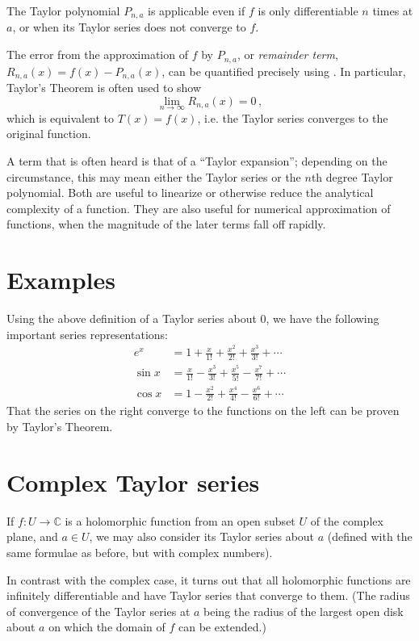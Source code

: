 \documentclass[12pt]{article}
\newcommand{\complex}{\mathbb{C}}
\providecommand{\defnterm}[1]{\emph{#1}}
\begin{document}
The Taylor polynomial $P_{n,a}$ is applicable even if $f$ is only
differentiable $n$ times at $a$, or when its Taylor series does 
not converge to $f$.

The error from the approximation of $f$ by $P_{n,a}$,  
or \defnterm{remainder term}, $R_{n,a}(x) = f(x) - P_{n,a}(x)$, 
can be quantified precisely
using  .
In particular, Taylor's Theorem is often used to show
\[
 \lim_{n\rightarrow \infty} R_{n,a}(x) = 0 \,,
\]
which is equivalent to $T(x) = f(x)$, i.e. the Taylor series
converges to the original function.

A term that is often heard is that of a ``Taylor expansion'';
depending on the circumstance, this may mean either the Taylor series
or the $n$th degree Taylor polynomial.
Both are useful to linearize or otherwise reduce the analytical complexity of a function.  They are also useful for numerical approximation of functions,
when the magnitude of the later terms fall off rapidly.  

\section{Examples}
Using the above definition of a Taylor series about $0$, we have the following important series representations:
\begin{align*}
 e^x &= 1 + \frac{x}{1!} + \frac{x^2}{2!} + \frac{x^3}{3!} + \cdots \\ 
  \sin x &= \frac{x}{1!} - \frac{x^3}{3!} + \frac{x^5}{5!} - \frac{x^7}{7!} + \cdots \\
  \cos x &= 1-\frac{x^2}{2!} + \frac{x^4}{4!} - \frac{x^6}{6!} + \cdots 
\end{align*}
That the series on the right converge to the functions on the left
can be proven by Taylor's Theorem.

\section{Complex Taylor series}
If $f\colon U \to \complex$ is a holomorphic function from an open subset $U$ of the complex plane, and $a \in U$, we may also consider its Taylor series about $a$ (defined with the same formulae as before, but with complex numbers).

In contrast with the complex case, it turns out that all holomorphic functions
are infinitely differentiable and have Taylor series that converge to them.
(The radius of convergence of the Taylor series at $a$ being the radius of the largest open disk about $a$ on which the domain of $f$ can be extended.)
\end{document}
